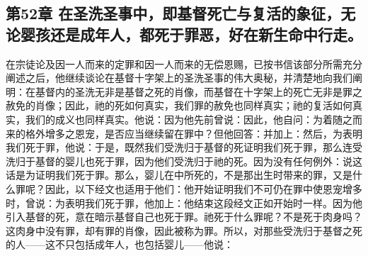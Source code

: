 
\subsection{第52章 在圣洗圣事中，即基督死亡与复活的象征，无论婴孩还是成年人，都死于罪恶，好在新生命中行走。}

在宗徒论及因一人而来的定罪和因一人而来的无偿恩赐，已按书信该部分所需充分阐述之后，他继续谈论在基督十字架上的圣洗圣事的伟大奥秘，并清楚地向我们阐明：在基督内的圣洗无非是基督之死的肖像，而基督在十字架上的死亡无非是罪之赦免的肖像；因此，祂的死如何真实，我们罪的赦免也同样真实；祂的复活如何真实，我们的成义也同样真实。他说：因为他先前曾说：因此，他自问：为着随之而来的格外增多之恩宠，是否应当继续留在罪中？但他回答：并加上：然后，为表明我们死于罪，他说：于是，既然我们受洗归于基督的死证明我们死于罪，那么连受洗归于基督的婴儿也死于罪，因为他们受洗归于祂的死。因为没有任何例外：说这话是为证明我们死于罪。那么，婴儿在中所死的，不是那出生时带来的罪，又是什么罪呢？因此，以下经文也适用于他们：他开始证明我们不可仍在罪中使恩宠增多时，曾说：为表明我们死于罪，他加上：他结束这段经文正如开始时一样。因为他引入基督的死，意在暗示基督自己也死于罪。祂死于什么罪呢？不是死于肉身吗？这肉身中没有罪，却有罪的肖像，因此被称为罪。所以，对那些受洗归于基督之死的人——这不只包括成年人，也包括婴儿——他说：\par


